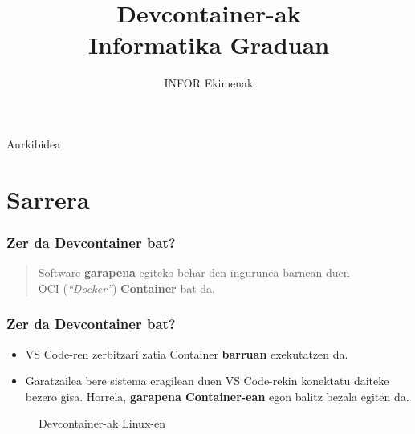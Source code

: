 \documentclass[lang=eu,biz=foe,aspectratio=169,handout]{mupresentation}
\title{Devcontainer-ak\\Informatika Graduan}
\subtitle{INFOR Ekimenak}
\institute{Mondragon Unibertsitatea}
\date{}
\begin{document}
\mucover

\setcounter{tocdepth}{1}
\begin{frame}{Aurkibidea}
  \tableofcontents
\end{frame}

\section{Sarrera}

\begin{frame}
  \frametitle{Zer da Devcontainer bat?}
  \begin{quote}
    Software \textbf{garapena} egiteko behar den ingurunea barnean duen\\ OCI (\textit{``Docker''}) \textbf{Container} bat da.
  \end{quote}
\end{frame}

\begin{frame}
  \frametitle{Zer da Devcontainer bat?}
  \begin{itemize}
    \item VS Code-ren zerbitzari zatia Container \textbf{barruan} exekutatzen da.
    \item Garatzailea bere sistema eragilean duen VS Code-rekin konektatu daiteke bezero gisa. Horrela, \textbf{garapena Container-ean} egon balitz bezala egiten da.
  \end{itemize}
  \begin{figure}
    \centering
    \caption{Devcontainer-ak Linux-en}
  \end{figure}
\end{frame}
\end{document}
